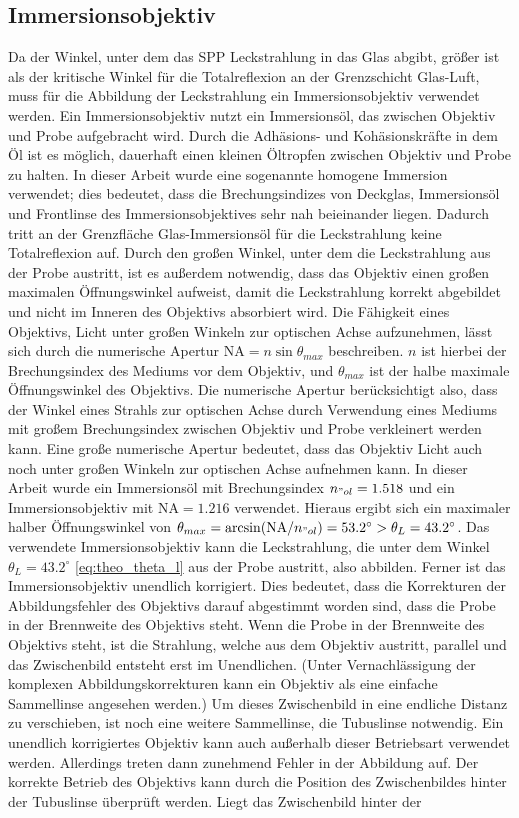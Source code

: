 \documentclass[a4paper, titlepage,  ngerman]{book}
\begin{document}
	\subsection{Immersionsobjektiv}
	Da der Winkel, unter dem das SPP Leckstrahlung in das Glas abgibt, größer ist als der kritische Winkel für die Totalreflexion an der Grenzschicht Glas-Luft, muss für die Abbildung der Leckstrahlung ein Immersionsobjektiv verwendet werden. Ein Immersionsobjektiv nutzt ein Immersionsöl, das zwischen Objektiv und Probe aufgebracht wird. Durch die Adhäsions- und Kohäsionskräfte in dem Öl ist es möglich, dauerhaft einen kleinen Öltropfen zwischen Objektiv und Probe zu halten. In dieser Arbeit  wurde eine sogenannte homogene Immersion verwendet; dies bedeutet, dass die Brechungsindizes von Deckglas, Immersionsöl und Frontlinse des Immersionsobjektives sehr nah beieinander liegen. Dadurch tritt an der Grenzfläche Glas-Immersionsöl für die Leckstrahlung keine Totalreflexion auf. Durch den großen Winkel, unter dem die Leckstrahlung aus der Probe austritt, ist es außerdem notwendig, dass das Objektiv einen großen maximalen Öffnungswinkel aufweist, damit die Leckstrahlung korrekt abgebildet und nicht im Inneren des Objektivs absorbiert wird. Die Fähigkeit eines Objektivs, Licht unter großen Winkeln zur optischen Achse aufzunehmen, lässt sich durch die numerische Apertur $\mathrm{NA} = n\sin\theta_{max}$ beschreiben. $n$ ist hierbei der Brechungsindex des Mediums vor dem Objektiv, und $\theta_{max}$ ist der halbe maximale Öffnungswinkel des Objektivs. Die numerische Apertur berücksichtigt also, dass der Winkel eines Strahls zur optischen Achse durch Verwendung eines Mediums mit großem Brechungsindex zwischen Objektiv und Probe verkleinert werden kann. Eine große numerische Apertur bedeutet, dass das Objektiv Licht auch noch unter großen Winkeln zur optischen Achse aufnehmen kann. In dieser Arbeit wurde ein Immersionsöl mit Brechungsindex $n_{"ol} = 1.518$ und ein Immersionsobjektiv mit $\mathrm{NA} = 1.216$ verwendet. Hieraus ergibt sich ein maximaler halber Öffnungswinkel von $\theta_{max} = \arcsin(\mathrm{NA} / n_{"ol}) = 53.2^\circ > \theta_L = 43.2^\circ$. Das verwendete Immersionsobjektiv kann die Leckstrahlung, die unter dem Winkel $\theta_L = 43.2^\circ$ \eqref{eq:theo_theta_l} aus der Probe austritt, also abbilden. Ferner ist das Immersionsobjektiv unendlich korrigiert. Dies bedeutet, dass die Korrekturen der Abbildungsfehler des Objektivs darauf abgestimmt worden sind, dass die Probe in der Brennweite des Objektivs steht. Wenn die Probe in der Brennweite des Objektivs steht, ist die Strahlung, welche aus dem Objektiv austritt, parallel und das Zwischenbild entsteht erst im Unendlichen. (Unter Vernachlässigung der komplexen Abbildungskorrekturen kann ein Objektiv als eine einfache Sammellinse angesehen werden.) Um dieses Zwischenbild in eine endliche Distanz zu verschieben, ist noch eine weitere Sammellinse, die Tubuslinse notwendig. Ein unendlich korrigiertes Objektiv kann auch außerhalb dieser Betriebsart verwendet werden. Allerdings treten dann zunehmend Fehler in der Abbildung auf. Der korrekte Betrieb des Objektivs kann durch die Position des Zwischenbildes hinter der Tubuslinse überprüft werden. Liegt das Zwischenbild hinter der 
\end{document}
